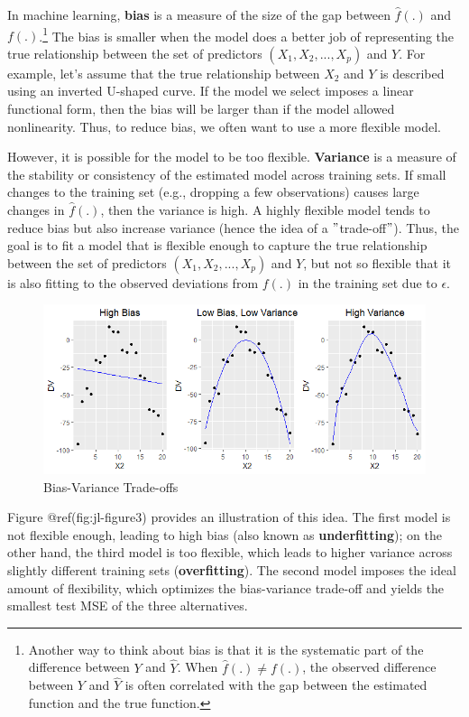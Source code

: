 \documentclass{book}
\begin{document}
In machine learning, \textbf{bias} is a measure of the size of the gap between
\(\hat{f}(.)\) and \({f}(.)\).\footnote{Another way to think about bias is
  that it is the systematic part of the difference between \(Y\) and
  \(\hat{Y}\). When \(\hat{f}(.)\neq{f}(.)\), the observed difference between
  \(Y\) and \(\hat{Y}\) is often correlated with the gap between the estimated
  function and the true function.} The bias is smaller when the model does a
better job of representing the true relationship between the set of predictors
\((X_{1},X_{2},...,X_{p})\) and \(Y\). For example, let's assume that the true
relationship between \(X_{2}\) and \(Y\) is described using an inverted
U-shaped curve. If the model we select imposes a linear functional form, then
the bias will be larger than if the model allowed nonlinearity. Thus, to
reduce bias, we often want to use a more flexible model.

However, it is possible for the model to be too flexible. \textbf{Variance} is
a measure of the stability or consistency of the estimated model across
training sets. If small changes to the training set (e.g., dropping a few
observations) causes large changes in \(\hat{f}(.)\), then the variance is
high. A highly flexible model tends to reduce bias but also increase variance
(hence the idea of a \("\)trade-off\("\)). Thus, the goal is to fit a model
that is flexible enough to capture the true relationship between the set of
predictors \((X_{1},X_{2},...,X_{p})\) and \(Y\), but not so flexible that it
is also fitting to the observed deviations from \({f}(.)\) in the training set
due to \(\epsilon\).

\begin{figure}
\hypertarget{fig:jl-figure3}{%
\centering
\includegraphics{images/ml/jl-figure3.png}
\caption{Bias-Variance Trade-offs}\label{fig:jl-figure3}
}
\end{figure}

Figure @ref(fig:jl-figure3) provides an illustration of this idea. The first
model is not flexible enough, leading to high bias (also known as
\textbf{underfitting}); on the other hand, the third model is too flexible,
which leads to higher variance across slightly different training sets
(\textbf{overfitting}). The second model imposes the ideal amount of
flexibility, which optimizes the bias-variance trade-off and yields the
smallest test MSE of the three alternatives.
\end{document}
